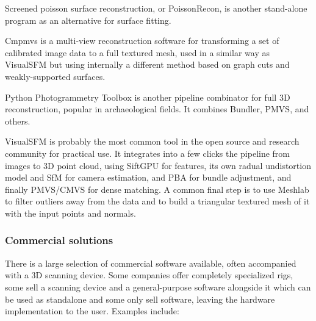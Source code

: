 Screened poisson surface reconstruction, or PoissonRecon, is another stand-alone program as an alternative for surface fitting. \cite{kazhdan2013screened}

Cmpmvs is a multi-view reconstruction software for transforming a set of calibrated image data to a full textured mesh, used in a similar way as VisualSFM but using internally a different method based on graph cuts and weakly-supported surfaces.
\cite{jancosek2011multi}

Python Photogrammetry Toolbox is another pipeline combinator for full 3D reconstruction, popular in archaeological fields. It combines Bundler, PMVS, and others. \cite{moulon2011python}


VisualSFM is probably the most common tool in the open source and research community for practical use.
It integrates into a few clicks the pipeline from images to 3D point cloud, using SiftGPU for features, its own radual undistortion model and SfM for camera estimation, and PBA for bundle adjustment, and finally PMVS/CMVS for dense matching.
A common final step is to use Meshlab to filter outliers away from the data and to build a triangular textured mesh of it with the input points and normals.


\subsubsection{Commercial solutions} %

There is a large selection of commercial software available, often accompanied with a 3D scanning device.
Some companies offer completely specialized rigs, some sell a scanning device and a general-purpose software alongside it which can be used as standalone and some only sell software, leaving the hardware implementation to the user.
Examples include:

